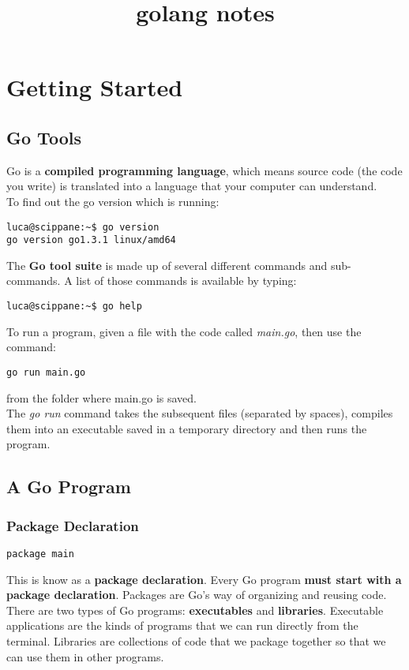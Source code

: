 \documentclass[10pt,letterpaper]{report}
\begin{document}
\title{golang notes}
\maketitle
\tableofcontents
\chapter{Getting Started}
\section{Go Tools}
Go is a \textbf{compiled programming language}, which means source code (the code you write) is translated into a language that your computer can understand.\\
To find out the go version which is running:
\begin{lstlisting}
luca@scippane:~$ go version
go version go1.3.1 linux/amd64
\end{lstlisting}
The \textbf{Go tool suite} is made up of several different commands and sub-commands. A list of those commands is available by typing:
\begin{lstlisting}
luca@scippane:~$ go help
\end{lstlisting}
To run a program, given a file with the code called \textit{main.go}, then use the command:
\begin{lstlisting}
go run main.go
\end{lstlisting}
from the folder where main.go is saved.\\
The \textit{go run} command takes the subsequent files (separated by spaces), compiles them into an executable saved in a temporary directory and then runs the program.
\section{A Go Program}
\subsection{Package Declaration}
\begin{lstlisting}
package main
\end{lstlisting}
This is know as a \textbf{package declaration}. Every Go program \textbf{must start with a package declaration}. Packages are Go's way of organizing and reusing code.\\
There are two types of Go programs: \textbf{executables} and \textbf{libraries}. Executable applications are the kinds of programs that we can run directly from the terminal. Libraries are collections of code that we package together so that we can use them in other programs.\\
\end{document}
